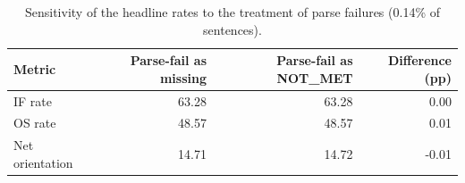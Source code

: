 \begin{table}[t]
\centering
\small
\caption{Sensitivity of the headline rates to the treatment of parse failures (0.14\% of sentences).}
\label{tab:parsefail}
\begin{tabular}{lrrr}
\toprule
Metric & Parse-fail as missing & Parse-fail as NOT\_MET & Difference (pp) \\
\midrule
IF rate & 63.28 & 63.28 & 0.00 \\
OS rate & 48.57 & 48.57 & 0.01 \\
Net orientation & 14.71 & 14.72 & -0.01 \\
\bottomrule
\end{tabular}
\end{table}
